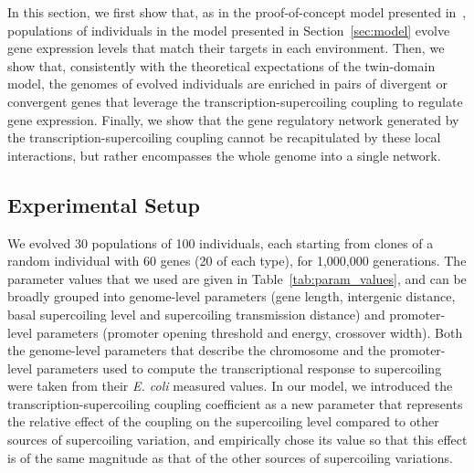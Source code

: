 In this section, we first show that, as in the proof-of-concept model presented in~\citep{grohens2021}, populations of individuals in the model presented in Section~\ref{sec:model} evolve gene expression levels that match their targets in each environment.
Then, we show that, consistently with the theoretical expectations of the twin-domain model, the genomes of evolved individuals are enriched in pairs of divergent or convergent genes that leverage the transcription-supercoiling coupling to regulate gene expression.
Finally, we show that the gene regulatory network generated by the transcription-supercoiling coupling cannot be recapitulated by these local interactions, but rather encompasses the whole genome into a single network.

\subsection{Experimental Setup}

We evolved 30 populations of 100 individuals, each starting from clones of a random individual with 60 genes (20 of each type), for 1,000,000 generations.
The parameter values that we used are given in Table~\ref{tab:param_values}, and can be broadly grouped into genome-level parameters (gene length, intergenic distance, basal supercoiling level and supercoiling transmission distance) and promoter-level parameters (promoter opening threshold and energy, crossover width).
Both the genome-level parameters that describe the chromosome and the promoter-level parameters used to compute the transcriptional response to supercoiling were taken from their \emph{E. coli} measured values.
In our model, we introduced the transcription-supercoiling coupling coefficient as a new parameter that represents the relative effect of the coupling on the supercoiling level compared to other sources of supercoiling variation, and empirically chose its value so that this effect is of the same magnitude as that of the other sources of supercoiling variations.

